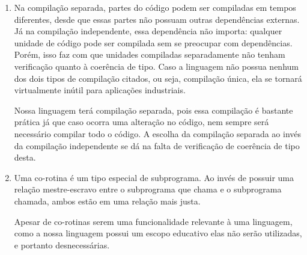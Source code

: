 \documentclass[12pt, a4paper]{article}
\begin{document}
\begin{enumerate}
\begin{comment}
            soma(1, 2);
            soma(1.5, 2.5);
            soma(“teste”, “ ftw”);

            Sem sobrecarga:

            int somaInt(int a, int b) {
                return a+b;
            }

            float somaFloat(float a, float b) {
                return a+b;
            }

            int somaString(String a, String b) {
                return a^b;
            }
        \end{comment}

        \item
        \begin{comment}
        (Compilação separada: as unidades de compilação podem ser compiladas em
        tempos diferentes, mas elas não são independentes uma da outra se
        qualquer uma delas acessar ou usar quaisquer entidades da outra. Tal
        interdependência é necessária se precisar ser feita verificação de
        interface.) (Compilação independente: unidades de programa podem ser compiladas sem
        informações sobre quaisquer outras unidades de programa. Unidades
        compiladas separadamente não são verificadas quanto à coerência de
        tipos) (Algumas linguagens não oferecem nem compilação separada, nem
        compilação independente, significando que somente a unidade de
        compilação é um programa completo. Isso a torna virtualmente inútil
        para aplicações industriais)
		\end{comment}
		Na compilação separada, partes do código podem ser compiladas em tempos diferentes, desde que essas partes não possuam outras dependências externas. Já na compilação independente, essa dependência não importa: qualquer unidade de código pode ser compilada sem se preocupar com dependências. Porém, isso faz com que unidades compiladas separadamente não tenham verificação quanto à coerência de tipo. Caso a linguagem não possua nenhum dos dois tipos de compilação citados, ou seja, compilação única, ela se tornará virtualmente inútil para aplicações industriais.		
		
        Nossa linguagem terá compilação separada, pois essa compilação é
        bastante prática já que caso ocorra uma alteração no código, nem sempre
        será necessário compilar todo o código. A escolha da compilação
        separada ao invés da compilação independente se dá na falta de
        verificação de coerência de tipo desta.

        \item
        Uma co-rotina é um tipo especial de subprograma. Ao invés de possuir
        uma relação mestre-escravo entre o subprograma que chama e o
        subprograma chamada, ambos estão em uma relação mais justa.

        Apesar de co-rotinas serem uma funcionalidade relevante à uma
        linguagem, como a nossa linguagem possui um escopo educativo elas não
        serão utilizadas, e portanto desnecessárias.

    \end{enumerate}
\end{document}
